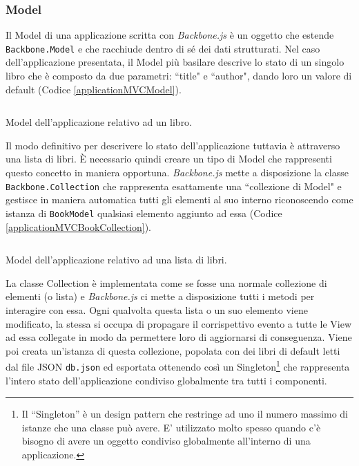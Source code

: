 \subsubsection{Model}
Il Model di una applicazione scritta con \textit{Backbone.js} è un oggetto che estende \texttt{Backbone.Model} e che racchiude dentro di sé dei dati strutturati. Nel caso dell'applicazione presentata, il Model più basilare descrive lo stato di un singolo libro che è composto da due parametri: “title" e “author", dando loro un valore di default (Codice \ref{applicationMVCModel}).

\begin{listing}[ht]
\inputminted{Javascript}{sources/applicationMVCBookModel.js}
\caption{Model dell'applicazione relativo ad un libro.} 
\label{applicationMVCModel} 
\end{listing}

Il modo definitivo per descrivere lo stato dell'applicazione tuttavia è attraverso una lista di libri. È necessario quindi creare un tipo di Model che rappresenti questo concetto in maniera opportuna. \textit{Backbone.js} mette a disposizione la classe \texttt{Backbone.Collection} che rappresenta esattamente una “collezione di Model" e gestisce in maniera automatica tutti gli elementi al suo interno riconoscendo come istanza di \texttt{BookModel} qualsiasi elemento aggiunto ad essa (Codice \ref{applicationMVCBookCollection}).

\begin{listing}[ht]
\inputminted{Javascript}{sources/applicationMVCBookshelfCollection.js}
\caption{Model dell'applicazione relativo ad una lista di libri.} 
\label{applicationMVCBookCollection} 
\end{listing}

La classe Collection è implementata come se fosse una normale collezione di elementi (o lista) e \textit{Backbone.js} ci mette a disposizione tutti i metodi per interagire con essa. 
Ogni qualvolta questa lista o un suo elemento viene modificato, la stessa si occupa di propagare il corrispettivo evento a tutte le View ad essa collegate in modo da permettere loro di aggiornarsi di conseguenza.
Viene poi creata un'istanza di questa collezione, popolata con dei libri di default letti dal file JSON \texttt{db.json} ed esportata ottenendo così un Singleton\footnote{Il “Singleton” è un design pattern che restringe ad uno il numero massimo di istanze che una classe può avere. E' utilizzato molto spesso quando c'è bisogno di avere un oggetto condiviso globalmente all'interno di una applicazione.} che rappresenta l'intero stato dell'applicazione condiviso globalmente tra tutti i componenti.

